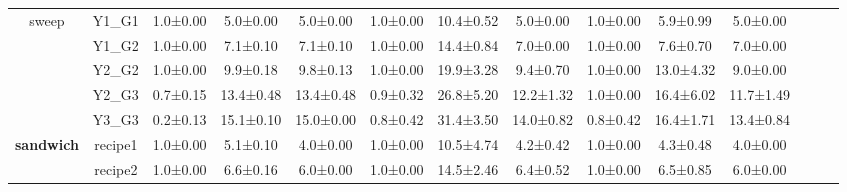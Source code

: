 \documentclass[11pt]{article}
\theoremstyle{plain}
\theoremstyle{remark}
\begin{document}
\begin{table}[t]
\begin{center}
\begin{small}
\begin{sc}
\begin{adjustbox}{width=1\textwidth}
\begin{tabular}{ccccccccccclll}
\multirow{5}{*}{sweep}    & \multicolumn{1}{c|}{Y1\_G1}  & 1.0±0.00  & 5.0±0.00   & \multicolumn{1}{c|}{5.0±0.00}  & 1.0±0.00  & 10.4±0.52  & \multicolumn{1}{c|}{5.0±0.00}  & 1.0±0.00  & 5.9±0.99     & 5.0±0.00                       &                               &                                &                               \\
                          & \multicolumn{1}{c|}{Y1\_G2}  & 1.0±0.00  & 7.1±0.10   & \multicolumn{1}{c|}{7.1±0.10}  & 1.0±0.00  & 14.4±0.84  & \multicolumn{1}{c|}{7.0±0.00}  & 1.0±0.00  & 7.6±0.70     & 7.0±0.00                       &                               &                                &                               \\
                          & \multicolumn{1}{c|}{Y2\_G2}  & 1.0±0.00  & 9.9±0.18   & \multicolumn{1}{c|}{9.8±0.13}  & 1.0±0.00  & 19.9±3.28  & \multicolumn{1}{c|}{9.4±0.70}  & 1.0±0.00  & 13.0±4.32    & 9.0±0.00                       &                               &                                &                               \\
                          & \multicolumn{1}{c|}{Y2\_G3}  & 0.7±0.15  & 13.4±0.48  & \multicolumn{1}{c|}{13.4±0.48} & 0.9±0.32  & 26.8±5.20  & \multicolumn{1}{c|}{12.2±1.32} & 1.0±0.00  & 16.4±6.02    & 11.7±1.49                      &                               &                                &                               \\
                          & \multicolumn{1}{c|}{Y3\_G3}  & 0.2±0.13  & 15.1±0.10  & \multicolumn{1}{c|}{15.0±0.00} & 0.8±0.42  & 31.4±3.50  & \multicolumn{1}{c|}{14.0±0.82} & 0.8±0.42  & 16.4±1.71    & 13.4±0.84                      &                               &                                &                               \\ \cline{1-11}
\multirow{4}{*}{\textbf{sandwich}} & \multicolumn{1}{c|}{recipe1} & 1.0±0.00  & 5.1±0.10   & \multicolumn{1}{c|}{4.0±0.00}  & 1.0±0.00  & 10.5±4.74  & \multicolumn{1}{c|}{4.2±0.42}  & 1.0±0.00  & 4.3±0.48     & 4.0±0.00                       &                               &                                &                               \\
                          & \multicolumn{1}{c|}{recipe2} & 1.0±0.00  & 6.6±0.16   & \multicolumn{1}{c|}{6.0±0.00}  & 1.0±0.00  & 14.5±2.46  & \multicolumn{1}{c|}{6.4±0.52}  & 1.0±0.00  & 6.5±0.85     & 6.0±0.00                       &                               &                                &                               \\

\end{tabular}
\end{adjustbox}
\end{sc}
\end{small}
\end{center}
\end{table}
\end{document}

